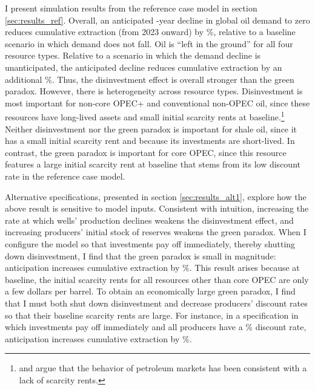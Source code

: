 \documentclass[12pt]{article}
\begin{document}
I present simulation results from the reference case model in section \ref{sec:results_ref}. Overall, an anticipated \unskip-year decline in global oil demand to zero reduces cumulative extraction (from 2023 onward) by \unskip\%, relative to a baseline scenario in which demand does not fall. Oil is ``left in the ground'' for all four resource types. Relative to a scenario in which the demand decline is unanticipated, the anticipated decline reduces cumulative extraction by an additional \unskip\%. Thus, the disinvestment effect is overall stronger than the green paradox. However, there is heterogeneity across resource types. Disinvestment is most important for non-core OPEC+ and conventional non-OPEC oil, since these resources have long-lived assets and small initial scarcity rents at baseline.\footnote{\cite{adelman1990} and \cite{hartspiro2011} argue that the behavior of petroleum markets has been consistent with a lack of scarcity rents.} Neither disinvestment nor the green paradox is important for shale oil, since it has a small initial scarcity rent and because its investments are short-lived. In contrast, the green paradox is important for core OPEC, since this resource features a large initial scarcity rent at baseline that stems from its low discount rate in the reference case model.

Alternative specifications, presented in section \ref{sec:results_alt1}, explore how the above result is sensitive to model inputs. Consistent with intuition, increasing the rate at which wells' production declines weakens the disinvestment effect, and increasing producers' initial stock of reserves weakens the green paradox. When I configure the model so that investments pay off immediately, thereby shutting down disinvestment, I find that the green paradox is small in magnitude: anticipation increases cumulative extraction by \unskip\%. This result arises because at baseline, the initial scarcity rents for all resources other than core OPEC are only a few dollars per barrel. To obtain an economically large green paradox, I find that I must both shut down disinvestment and decrease producers' discount rates so that their baseline scarcity rents are large. For instance, in a specification in which investments pay off immediately and all producers have a \unskip\% discount rate, anticipation increases cumulative extraction by \unskip\%. 
\end{document}

